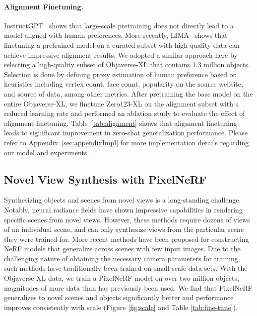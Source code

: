 \paragraph{Alignment Finetuning.}
InstructGPT~\cite{ouyang2022training} shows that large-scale pretraining does not directly lead to a model aligned with human preferences. More recently, LIMA~\cite{zhou2023lima} shows that finetuning a pretrained model on a curated subset with high-quality data can achieve impressive alignment results. We adopted a similar approach here by selecting a high-quality subset of Objaverse-XL that contains 1.3 million objects. Selection is done by defining proxy estimation of human preference based on heuristics including vertex count, face count, popularity on the source website, and source of data, among other metrics. After pretraining the base model on the entire Objaverse-XL, we finetune Zero123-XL on the alignment subset with a reduced learning rate and performed an ablation study to evaluate the effect of alignment finetuning. Table~\ref{tab:alignment} shows that alignment finetuning leads to significant improvement in zero-shot generalization performance. Please refer to Appendix~\ref{sec:appendixImpl} for more implementation details regarding our model and experiments.

\subsection{Novel View Synthesis with PixelNeRF}
Synthesizing objects and scenes from novel views is a long-standing challenge. Notably, neural radiance fields \cite{mildenhall2020nerf} have shown impressive capabilities in rendering specific scenes from novel views. However, these methods require dozens of views of an individual scene, and can only synthesize views from the particular scene they were trained for.  More recent methods \cite{deng2022depth, jain2021putting, wang2021ibrnet, yu2021pixelnerf} have been proposed for constructing NeRF models that generalize across scenes with few input images. Due to the challenging nature of obtaining the necessary camera parameters for training, such methods have traditionally been trained on small scale data sets. With the Objaverse-XL data, we train a PixelNeRF model on over two million objects, magnitudes of more data than has previously been used. We find that PixelNeRF generalizes to novel scenes and objects significantly better and performance improves consistently with scale (Figure \ref{fig:scale} and Table \ref{tab:fine-tune}). 

